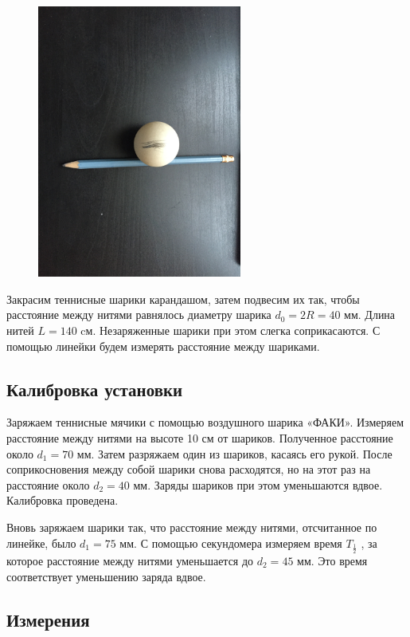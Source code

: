 \documentclass[a4paper, 12pt]{article}
\begin{document}
\begin{figure}[H]
\begin{center}
\includegraphics[width=0.6\textwidth]{4}
\end{center}
\end{figure}


Закрасим теннисные шарики карандашом, затем подвесим их так, чтобы расстояние между нитями равнялось диаметру шарика $d_0=2R=40$ мм. Длина нитей $L=140$ cм. Незаряженные шарики при этом слегка соприкасаются. С помощью линейки будем измерять расстояние между шариками.

\subsection*{Калибровка установки}

Заряжаем теннисные мячики с помощью воздушного шарика «ФАКИ». Измеряем расстояние между нитями на высоте 10 см от шариков. Полученное расстояние около $d_1=70$ мм. Затем разряжаем один из шариков, касаясь его рукой. После соприкосновения между собой шарики снова расходятся, но на этот раз на расстояние около $d_2=40$  мм. Заряды шариков при этом уменьшаются вдвое. Калибровка проведена.

Вновь заряжаем шарики так, что расстояние между нитями, отсчитанное по линейке, было $d_1=75$ мм. С помощью секундомера измеряем время $T_{\frac{1}{2}}$ , за которое расстояние между нитями уменьшается до $d_2 = 45$ мм. Это время соответствует уменьшению заряда вдвое.


\subsection*{Измерения}
\end{document}
